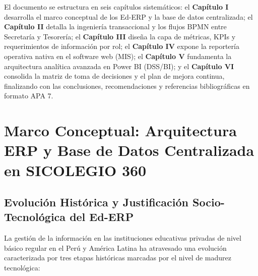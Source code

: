 \documentclass[12pt,a4paper,oneside]{report}
\begin{document}
    El documento se estructura en seis capítulos sistemáticos: el \textbf{Capítulo I} desarrolla el marco conceptual de los Ed-ERP y la base de datos centralizada; el \textbf{Capítulo II} detalla la ingeniería transaccional y los flujos BPMN entre Secretaría y Tesorería; el \textbf{Capítulo III} diseña la capa de métricas, KPIs y requerimientos de información por rol; el \textbf{Capítulo IV} expone la reportería operativa nativa en el software web (MIS); el \textbf{Capítulo V} fundamenta la arquitectura analítica avanzada en Power BI (DSS/BI); y el \textbf{Capítulo VI} consolida la matriz de toma de decisiones y el plan de mejora continua, finalizando con las conclusiones, recomendaciones y referencias bibliográficas en formato APA 7.

    \chapter{Marco Conceptual: Arquitectura ERP y Base de Datos Centralizada en SICOLEGIO 360}

    \section{Evolución Histórica y Justificación Socio-Tecnológica del Ed-ERP}

    La gestión de la información en las instituciones educativas privadas de nivel básico regular en el Perú y América Latina ha atravesado una evolución caracterizada por tres etapas históricas marcadas por el nivel de madurez tecnológica:
\end{document}
